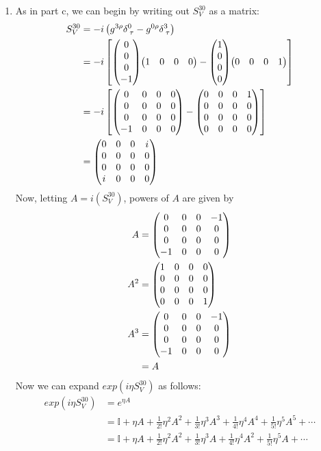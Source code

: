\documentclass[12pt]{article}
\begin{document}
\begin{enumerate}[label=(\alph*)]
    \item As in part c, we can begin by writing out $S_V^{30}$ as a matrix:
    \begin{align*}
        S_V^{30} &= -i\left(g^{3\rho}\delta_{\;\tau}^0 - g^{0\rho}\delta_{\;\tau}^3 \right) \\
        &= -i\left[\mqty(0\\0\\0\\-1)\mqty(1&0&0&0) - \mqty(1\\0\\0\\0)\mqty(0&0&0&1)\right] \\
        &= -i\left[\mqty(0&0&0&0\\0&0&0&0\\0&0&0&0\\-1&0&0&0) - \mqty(0&0&0&1\\0&0&0&0\\0&0&0&0\\0&0&0&0)\right] \\
        &= \mqty(0&0&0&i\\0&0&0&0\\0&0&0&0\\i&0&0&0)
    \end{align*}
    Now, letting $A = i\left(S_V^{30}\right)$, powers of $A$ are given by
    \begin{align*}
        A &= \mqty(0&0&0&-1\\0&0&0&0\\0&0&0&0\\-1&0&0&0) \\
        A^2 &= \mqty(1&0&0&0\\0&0&0&0\\0&0&0&0\\0&0&0&1) \\
        A^3 &= \mqty(0&0&0&-1\\0&0&0&0\\0&0&0&0\\-1&0&0&0) \\
        &= A
    \end{align*}
    Now we can expand $exp(i\eta S_V^{30})$ as follows:
    \begin{align*}
        exp(i\eta S_V^{30}) &= e^{\eta A} \\
        &= \mathbb{I} + \eta A + \frac{1}{2!}\eta^2A^2 + \frac{1}{3!}\eta^3A^3 + \frac{1}{4!}\eta^4A^4 + \frac{1}{5!}\eta^5A^5 + \cdots \\
        &= \mathbb{I} + \eta A + \frac{1}{2!}\eta^2A^2 + \frac{1}{3!}\eta^3A + \frac{1}{4!}\eta^4A^2 + \frac{1}{5!}\eta^5A + \cdots \\

\end{align*}
\end{enumerate}
\end{document}
